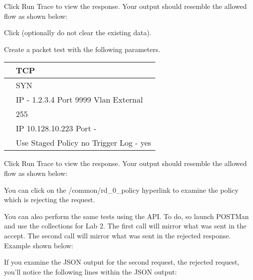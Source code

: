 \documentclass[letterpaper,10pt,english]{sphinxmanual}
\begin{document}
Click Run Trace to view the response. Your output should resemble the
allowed flow as shown below:


Click  (optionally do not clear the existing data).

Create a packet test with the following parameters.


\begin{savenotes}\sphinxattablestart
\centering
\begin{tabulary}{\linewidth}[t]{|T|T|}
\hline

&
TCP
\\
\hline
{}
&
SYN
\\
\hline
{}
&
IP - 1.2.3.4
Port \textendash{} 9999
Vlan \textendash{} External
\\
\hline
{}
&
255
\\
\hline
{}
&
IP \textendash{} 10.128.10.223
Port - 
\\
\hline
{}
&
Use Staged Policy \textendash{} no
Trigger Log - yes
\\
\hline
\end{tabulary}
\par
\sphinxattableend\end{savenotes}

Click Run Trace to view the response. Your output should resemble the
allowed flow as shown below:


You can click on the /common/rd\_0\_policy hyperlink to examine the
policy which is rejecting the request.

You can also perform the same tests using the API. To do, so launch
POSTMan and use the collections for Lab 2. The first call will mirror
what was sent in the accept. The second call will mirror what was sent
in the rejected response. Example shown below:


If you examine the JSON output for the second request, the rejected
request, you’ll notice the following lines within the JSON output:

\begin{sphinxVerbatim}[commandchars=\\\{\}]

 
              
 
              
\end{sphinxVerbatim}
\end{document}
